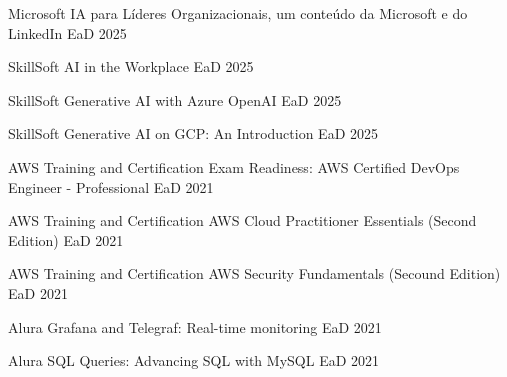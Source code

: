 
\begin{cvhonors}

  \cvhonor
    {Microsoft} %
    {IA para Líderes Organizacionais, um conteúdo da Microsoft e do LinkedIn} %
    {EaD} %
    {2025} %

  \cvhonor
    {SkillSoft} %
    {AI in the Workplace} %
    {EaD} %
    {2025} %

  \cvhonor
    {SkillSoft} %
    {Generative AI with Azure OpenAI} %
    {EaD} %
    {2025} %

  \cvhonor
    {SkillSoft} %
    {Generative AI on GCP: An Introduction} %
    {EaD} %
    {2025} %

  \cvhonor
    {AWS Training and Certification} %
    {Exam Readiness: AWS Certified DevOps Engineer - Professional} %
    {EaD} %
    {2021} %

  \cvhonor
    {AWS Training and Certification} %
    {AWS Cloud Practitioner Essentials (Second Edition)} %
    {EaD} %
    {2021} %

  \cvhonor
    {AWS Training and Certification} %
    {AWS Security Fundamentals (Secound Edition)} %
    {EaD} %
    {2021} %

  \cvhonor
    {Alura} %
    {Grafana and Telegraf: Real-time monitoring} %
    {EaD} %
    {2021} %

  \cvhonor
    {Alura} %
    {SQL Queries: Advancing SQL with MySQL} %
    {EaD} %
    {2021} %


\end{cvhonors}
